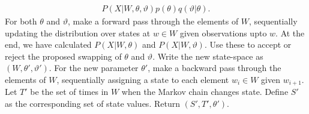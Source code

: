 \begin{algorithm}[H]
\begin{algorithmic}[1]
\begin{align*}
        {P(X| W,\theta, \vartheta)p(\theta) q(\vartheta|\theta)}.
        \end{align*}
    \State For both $\theta$ and $\vartheta$, make a forward pass through the 
    elements of $W$, sequentially updating the distribution over states at 
    $w \in W$ given observations upto $w$. At the end, we have calculated
    $P(X|W,\theta)$ and $P(X|W,\vartheta)$. Use these to accept or reject the
    proposed swapping of $\theta$ and $\vartheta$. Write the new state-space
    as $(W,\theta',\vartheta')$.
    \State For the new parameter $\theta'$, make a backward pass through 
    the elements of
    $W$, sequentially assigning a state to each element $w_i \in W$ given 
    $w_{i+1}$.
    \State Let $T'$ be the set of times in $W$ when the Markov chain changes state. Define $S'$ as the corresponding set of state values. Return $(S', T', \theta')$.
\end{algorithmic}
\end{algorithm}

